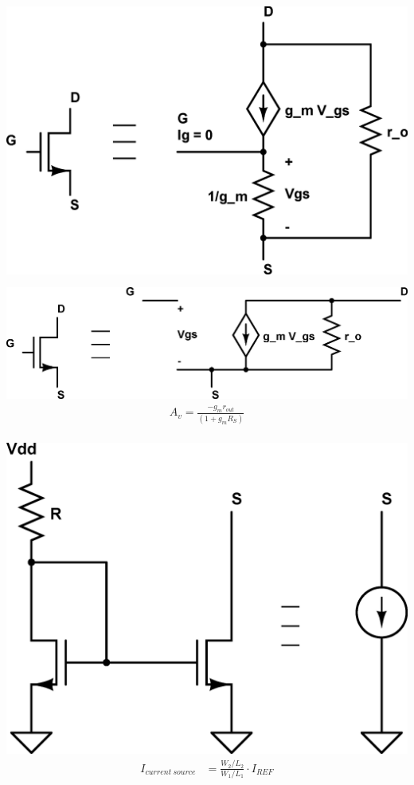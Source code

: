 \documentclass[10pt,letterpaper,english]{article}
\begin{document}
\begin{multicols}{2}
\includegraphics[scale=0.24]{mosfet-t-model.eps}
\begin{align*}
\tag*{Mosfet T-model}\\
\end{align*}
\includegraphics[scale=0.4]{mosfet-hybrid-pi.eps}
\vspace{2mm}
\begin{align*}
A_v = \frac{-g_mr_{out}}{(1 + g_mR_S)} \tag*{Mosfet hybrid pi model}\\
\end{align*}
\end{multicols}

\begin{multicols}{2}
\includegraphics[scale=0.2]{mosfet-current-mirror.eps}
\begin{align*}
I_{current\ source}&= \frac{W_2/L_2}{W_1/L_1}\cdot I_{REF} \tag*{MOSFET current mirror circuit}\nonumber\\
\end{align*}
\end{multicols}
\end{document}

